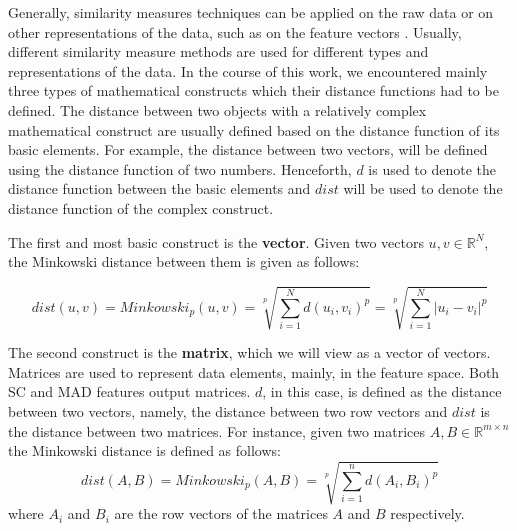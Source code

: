 \iftoggle{edit-mode}{\hspace{0pt}\marginpar{Different Representations}}{}
Generally, similarity measures techniques can be applied on the raw data or on other representations of the data, such as on the feature vectors \cite{chen2005similarity}. Usually, different similarity measure methods are used for different types and representations of the data. In the course of this work, we encountered mainly three types of mathematical constructs which their distance functions had to be defined.
The distance between two objects with a relatively complex mathematical construct are usually defined based on the distance function of its basic elements. For example, the distance between two vectors, will be defined using the distance function of two numbers. Henceforth, $d$ is used to denote the distance function between the basic elements and $dist$ will be used to denote the distance function of the complex construct.

\iftoggle{edit-mode}{\hspace{0pt}\marginpar{Vectors}}{}
The first and most basic construct is the \textbf{vector}. Given two vectors $u,v \in \mathbb{R}^{N}$, the Minkowski distance between them is given as follows:

\begin{equation}
dist(u,v)=Minkowski_p(u,v)=\sqrt[p]{\sum\limits_{i=1}^N d(u_i,v_i)^p}=\sqrt[p]{\sum\limits_{i=1}^N |u_i-v_i|^p}
\label{eq:minkowski}
\end{equation}

\iftoggle{edit-mode}{\hspace{0pt}\marginpar{Matrices}}{}
The second construct is the \textbf{matrix}, which we will view as a vector of vectors. Matrices are used to represent data elements, mainly, in the feature space. Both SC and MAD features output matrices. $d$, in this case, is defined as the distance between two vectors, namely, the distance between two row vectors and $dist$ is the distance between two matrices. For instance, given two matrices $A,B \in \mathbb{R}^{m \times n}$ the Minkowski distance is defined as follows:
\begin{equation}
dist(A,B) = Minkowski_p(A,B)=\sqrt[p]{\sum\limits_{i=1}^n d(A_i,B_i)^p}
\end{equation}
where $A_i$ and $B_i$ are the row vectors of the matrices $A$ and $B$ respectively.

